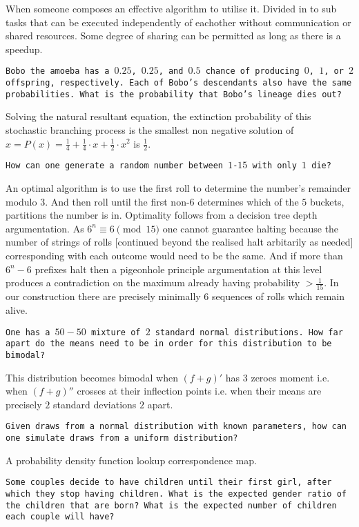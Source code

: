 When someone composes an effective algorithm to utilise it. Divided in to sub tasks that can be executed independently of eachother without communication or shared resources. Some degree of sharing can be permitted as long as there is a speedup.

\texttt{Bobo the amoeba has a $0.25$, $0.25$, and $0.5$ chance of producing $0$, $1$, or $2$ offspring, respectively. Each of Bobo's descendants also have the same probabilities. What is the probability that Bobo's lineage dies out?}

Solving the natural resultant equation, the extinction probability of this stochastic branching process is the smallest non negative solution of $x=P(x)=\frac{1}{4}+\frac{1}{4}\cdot x+\frac{1}{2} \cdot x^2$ is $\boxed{\frac{1}{2}}$.

\texttt{How can one generate a random number between $1$-$15$ with only $1$ die?}

An optimal algorithm is to use the first roll to determine the number's remainder modulo $3$. And then roll until the first non-$6$ determines which of the $5$ buckets, partitions the number is in. Optimality follows from a decision tree depth argumentation. As $ 6^n \equiv 6 \pmod{15}$ one cannot guarantee halting because the number of strings of rolls [continued beyond the realised halt arbitarily as needed] corresponding with each outcome would need to be the same. And if more than $6^n-6$ prefixes halt then a pigeonhole principle argumentation at this level produces a contradiction on the maximum already having probability $> \frac{1}{15}$. In our construction there are precisely minimally $6$ sequences of rolls which remain alive.

\texttt{One has a $50-50$ mixture of $2$ standard normal distributions. How far apart do the means need to be in order for this distribution to be bimodal?}

This distribution becomes bimodal when $(f+g)'$ has $3$ zeroes moment i.e. when $(f+g)''$ crosses at their inflection points i.e. when their means are precisely $2$ standard deviations $\boxed{2}$ apart.

\texttt{Given draws from a normal distribution with known parameters, how can one simulate draws from a uniform distribution?}

A probability density function lookup correspondence map.

\texttt{Some couples decide to have children until their first girl, after which they stop having children. What is the expected gender ratio of the children that are born? What is the expected number of children each couple will have?}

